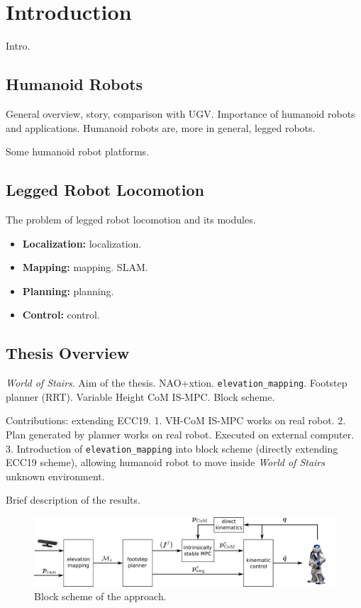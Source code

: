 \chapter{Introduction}
Intro.

\section{Humanoid Robots}
General overview, story, comparison with UGV. Importance of humanoid robots 
and applications. Humanoid robots are, more in 
general, legged robots.

Some humanoid robot platforms.

\section{Legged Robot Locomotion}
The problem of legged robot locomotion and its modules.

\begin{itemize}
  \item \textbf{Localization:} localization.
  \item \textbf{Mapping:} mapping. SLAM.
  \item \textbf{Planning:} planning.
  \item \textbf{Control:} control.
\end{itemize}

\section{Thesis Overview}
\textit{World of Stairs}. Aim of the thesis. NAO+xtion.
\texttt{elevation\_mapping}. Footstep planner (RRT).
Variable Height CoM IS-MPC. Block scheme.

Contributions: extending ECC19.
1. VH-CoM IS-MPC works on real robot.
2. Plan generated by planner works on real robot. Executed on external computer.
3. Introduction of \texttt{elevation\_mapping} into block scheme (directly
extending ECC19 scheme), allowing humanoid robot to move inside
\textit{World of Stairs} unknown environment.

Brief description of the results.

\begin{figure}
  \centering
  \includegraphics[width=\textwidth]{figures/BlockScheme.pdf}
  \caption{Block scheme of the approach.}
  \label{fig:block-scheme}
\end{figure}

